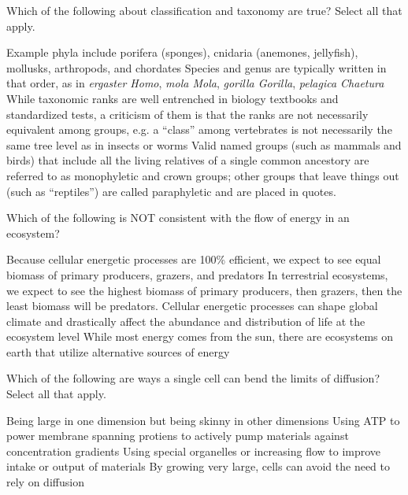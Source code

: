 \documentclass[exam,addpoints,noanswers]{exam}
\begin{document}
\begin{questions}
\question[1] Which of the following about classification and taxonomy are true? Select all that apply.
\begin{choices}
\CorrectChoice Example phyla include porifera (sponges), cnidaria (anemones, jellyfish), mollusks, arthropods, and chordates 
\choice Species and genus are typically written in that order, as in \emph{ergaster Homo}, \emph{mola Mola}, \emph{gorilla Gorilla}, \emph{pelagica Chaetura}
\CorrectChoice While taxonomic ranks are well entrenched in biology textbooks and standardized tests, a criticism of them is that the ranks are not necessarily equivalent among groups, e.g. a ``class'' among vertebrates is not necessarily the same tree level as in insects or worms
\CorrectChoice Valid named groups (such as mammals and birds) that include all the living relatives of a single common ancestory are referred to as monophyletic and crown groups; other groups that leave things out (such as ``reptiles'') are called paraphyletic and are placed in quotes. 
\end{choices}



\clearpage
\question[1] Which of the following is NOT consistent with the flow of energy in an ecosystem?
\begin{choices}
\CorrectChoice Because cellular energetic processes are 100\% efficient, we expect to see equal biomass of primary producers, grazers, and predators
\choice In terrestrial ecosystems, we expect to see the highest biomass of primary producers, then grazers, then the least biomass will be predators. 
\choice Cellular energetic processes can shape global climate and drastically affect the abundance and distribution of life at the ecosystem level
\choice While most energy comes from the sun, there are ecosystems on earth that utilize alternative sources of energy
\end{choices}





\question[1] Which of the following are ways a single cell can bend the limits of diffusion? Select all that apply. 
\begin{choices}
\CorrectChoice Being large in one dimension but being skinny in other dimensions
\CorrectChoice Using ATP to power membrane spanning protiens to actively pump materials against concentration gradients
\CorrectChoice Using special organelles or increasing flow to improve intake or output of materials
\choice By growing very large, cells can avoid the need to rely on diffusion
\end{choices}





\end{questions}
\end{document}
